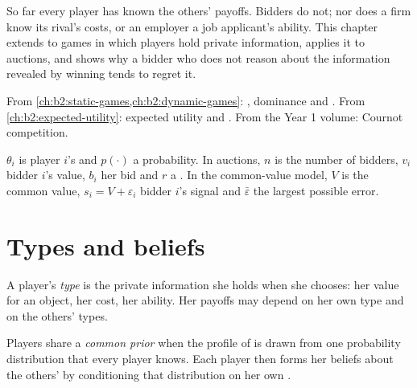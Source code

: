 So far every player has known the others' payoffs. Bidders do not; nor does a firm know its rival's costs, or an
employer a job applicant's ability. This chapter extends  to games in which players hold private
information, applies it to auctions, and shows why a bidder who does not reason about the information revealed
by winning tends to regret it.

\begin{recall}
From \cref{ch:b2:static-games,ch:b2:dynamic-games}: , dominance and .
From \cref{ch:b2:expected-utility}: expected utility and . From the Year 1 volume: Cournot
competition.
\end{recall}

\begin{notation}\label{not:b2:bayesian-games:symbols}
$\theta_i$ is player $i$'s  and $p(\cdot)$ a probability. In auctions, $n$ is the number of bidders, $v_i$ bidder $i$'s value, $b_i$
her bid and $r$ a . In the common-value model, $V$ is the common value, $s_i = V + \varepsilon_i$
bidder $i$'s signal and $\bar\varepsilon$ the largest possible error.
\end{notation}

\section{Types and beliefs}\label{sec:b2:bayesian-games:types}

\begin{definition}[Type]\label{def:b2:bayesian-games:type}
A player's \emph{type} is the private information she holds when she chooses: her
value for an object, her cost, her ability. Her payoffs may depend on her own type and on the others' types.
\end{definition}

\begin{definition}\label{def:b2:bayesian-games:common-prior}
Players share a \emph{common prior} when the profile of  is drawn from one probability
distribution that every player knows. Each player then forms her beliefs about the others'  by conditioning
that distribution on her own .
\end{definition}

